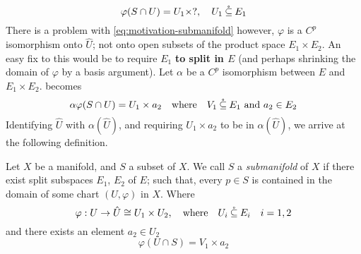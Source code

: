 \documentclass[../main-manifolds.tex]{subfiles}
\begin{document}
\begin{equation}\label{eq:motivation-submanifold}
    \varphi(S\cap U) = U_1\times ?,\quad U_1\:\mathring{\subseteq}\: E_1
\end{equation}
There is a problem with \cref{eq:motivation-submanifold} however, $\varphi$ is a $C^p$ isomorphism onto $\hat{U}$; not onto open subsets of the product space $E_1\times E_2$. An easy fix to this would be to require $E_1$ \textbf{to split in $E$} (and perhaps shrinking the domain of $\varphi$ by a basis argument). Let $\alpha$ be a $C^p$ isomorphism between $E$ and $E_1\times E_2$.  becomes
\begin{equation}\label{eq:motivation-submanifold-modified}
    \alpha\varphi(S\cap U) = U_1\times a_2\qqtext{where} V_1\osub E_1 \text{ and }a_2\in E_2
\end{equation}
Identifying $\hat{U}$ with $\alpha(\hat{U})$, and requiring $U_1\times a_2$ to be in $\alpha(\hat{U})$, we arrive at the following definition.
\begin{definition}[Submanifold]
    Let $X$ be a manifold, and $S$ a subset of $X$. We call $S$ a \emph{submanifold} of $X$ if there exist split subspaces $E_1$, $E_2$ of $E$; such that, every $p\in S$ is contained in the domain of some chart $(U,\varphi)$ in $X$. Where
    \begin{equation}\label{eq:submanifold-slice-chart-splits}
        \varphi: U\to \hat{U}\cong U_1\times U_2,\qqtext{where} U_i\osub E_i\quad i=1,2
    \end{equation}
    and there exists an element $a_2\in U_2$
    \begin{equation}\label{eq:submanifold-slice-chart-level-set}
        \varphi(U\cap S) = V_1\times a_2
    \end{equation}
\end{definition}
\end{document}
